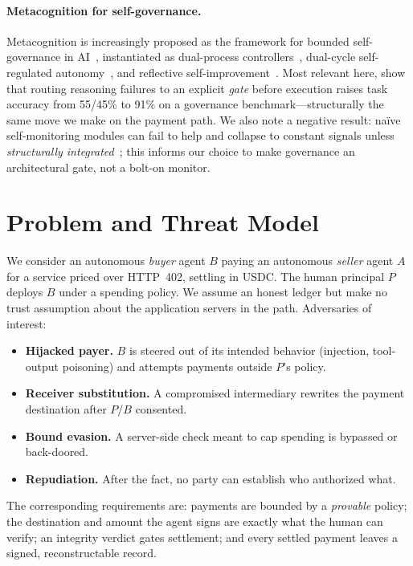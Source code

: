 \documentclass[11pt]{article}
\begin{document}
\paragraph{Metacognition for self-governance.} Metacognition is increasingly proposed as the
framework for bounded self-governance in AI~\citep{metaframework}, instantiated as dual-process
controllers~\citep{sofai}, dual-cycle self-regulated autonomy~\citep{midca}, and reflective
self-improvement~\citep{mars}. Most relevant here, \citet{governed} show that routing reasoning
failures to an explicit \emph{gate} before execution raises task accuracy from 55/45\% to 91\%
on a governance benchmark---structurally the same move we make on the payment path. We also note
a negative result: na\"ive self-monitoring modules can fail to help and collapse to constant
signals unless \emph{structurally integrated}~\citep{negresult}; this informs our choice to make
governance an architectural gate, not a bolt-on monitor.

\section{Problem and Threat Model}
\label{sec:threat}

We consider an autonomous \emph{buyer} agent $B$ paying an autonomous \emph{seller} agent $A$ for
a service priced over HTTP~402, settling in USDC. The human principal $P$ deploys $B$ under a
spending policy. We assume an honest ledger but make no trust assumption about the application
servers in the path. Adversaries of interest:

\begin{itemize}
  \item \textbf{Hijacked payer.} $B$ is steered out of its intended behavior (injection,
  tool-output poisoning) and attempts payments outside $P$'s policy.
  \item \textbf{Receiver substitution.} A compromised intermediary rewrites the payment
  destination after $P$/$B$ consented.
  \item \textbf{Bound evasion.} A server-side check meant to cap spending is bypassed or
  back-doored.
  \item \textbf{Repudiation.} After the fact, no party can establish who authorized what.
\end{itemize}

The corresponding requirements are: payments are bounded by a \emph{provable} policy; the
destination and amount the agent signs are exactly what the human can verify; an integrity
verdict gates settlement; and every settled payment leaves a signed, reconstructable record.
\end{document}

